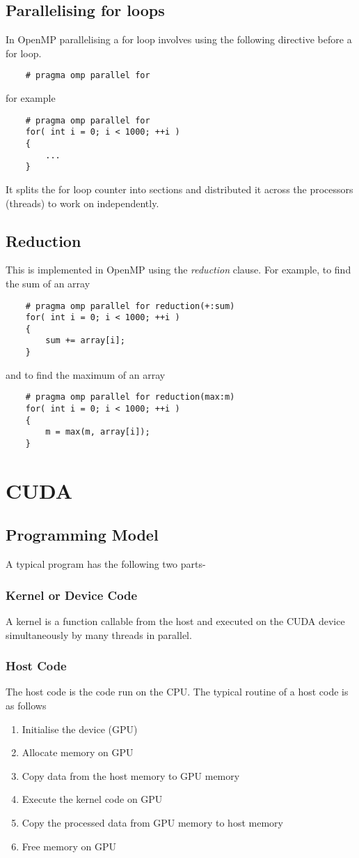 \documentclass[a4paper]{report}
\begin{document}
	\subsection{Parallelising for loops}
	In OpenMP parallelising a for loop involves using the following directive before a for loop.
	\begin{lstlisting}
	# pragma omp parallel for
	\end{lstlisting}
	for example
	\begin{lstlisting}
	# pragma omp parallel for
	for( int i = 0; i < 1000; ++i )
	{
		...
	}
	\end{lstlisting}
	It splits the for loop counter into sections and  distributed it across the processors (threads) to work on independently.
	
	\subsection{Reduction}
	This is implemented in OpenMP using the \emph{reduction} clause. For example, to find the sum of an array
	\begin{lstlisting}
	# pragma omp parallel for reduction(+:sum)
	for( int i = 0; i < 1000; ++i )
	{
		sum += array[i];
	}
	\end{lstlisting}
	and to find the maximum of an array
	\begin{lstlisting}
	# pragma omp parallel for reduction(max:m)
	for( int i = 0; i < 1000; ++i )
	{
		m = max(m, array[i]);
	}
	\end{lstlisting}
	
	\section{CUDA}	
	\subsection{Programming Model}
	A typical program has the following two parts-
	\subsubsection{Kernel or Device Code}
	A kernel is a function callable from the host and executed on the CUDA device simultaneously by many threads in parallel.
	\subsubsection{Host Code}
	The host code is the code run on the CPU. The typical routine of a host code is as follows
	\begin{enumerate}
	\item Initialise the device (GPU)
	\item Allocate memory on GPU
	\item Copy data from the host memory to GPU memory
	\item Execute the kernel code on GPU
	\item Copy the processed data from GPU memory to host memory
	\item Free memory on GPU
	\end{enumerate}
	
\end{document}
